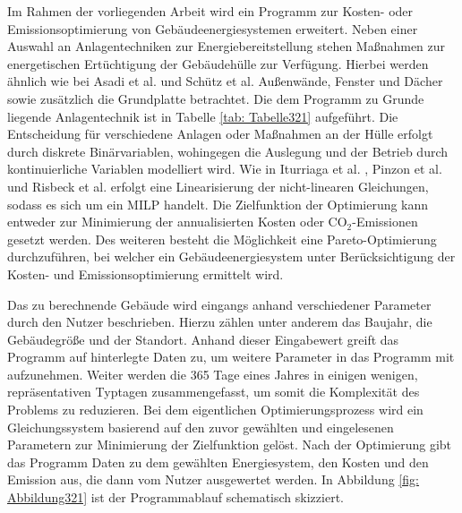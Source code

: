 Im Rahmen der vorliegenden Arbeit wird ein Programm zur Kosten- oder Emissionsoptimierung von Gebäudeenergiesystemen erweitert.
Neben einer Auswahl an Anlagentechniken zur Energiebereitstellung stehen Maßnahmen zur energetischen Ertüchtigung der Gebäudehülle zur Verfügung. 
Hierbei werden ähnlich wie bei Asadi et al. \cite{Asadi.2012} und Schütz et al. \cite{Schutz.2017} Außenwände, Fenster und Dächer sowie zusätzlich die Grundplatte betrachtet.
Die dem Programm zu Grunde liegende Anlagentechnik ist in Tabelle \ref{tab: Tabelle321} aufgeführt.
Die Entscheidung für verschiedene Anlagen oder Maßnahmen an der Hülle erfolgt durch diskrete Binärvariablen, wohingegen die Auslegung und der Betrieb durch kontinuierliche Variablen modelliert wird.
Wie in Iturriaga et al. \cite{Iturriaga.2017}, Pinzon et al. \cite{Pinzon.23.04.201726.04.2017} und Risbeck et al. \cite{Risbeck.2017} erfolgt eine Linearisierung der nicht-linearen Gleichungen, sodass es sich um ein MILP handelt.
Die Zielfunktion der Optimierung kann entweder zur Minimierung der annualisierten Kosten oder CO\(_2\)-Emissionen gesetzt werden.
Des weiteren besteht die Möglichkeit eine Pareto-Optimierung durchzuführen, bei welcher ein Gebäudeenergiesystem unter Berücksichtigung der Kosten- und Emissionsoptimierung ermittelt wird.

Das zu berechnende Gebäude wird eingangs anhand verschiedener Parameter durch den Nutzer beschrieben.
Hierzu zählen unter anderem das Baujahr, die Gebäudegröße und der Standort.
Anhand dieser Eingabewert greift das Programm auf hinterlegte Daten zu, um weitere Parameter in das Programm mit aufzunehmen.
Weiter werden die 365 Tage eines Jahres in einigen wenigen, repräsentativen Typtagen zusammengefasst, um somit die Komplexität des Problems zu reduzieren.
Bei dem eigentlichen Optimierungsprozess wird ein Gleichungssystem basierend auf den zuvor gewählten und eingelesenen Parametern zur Minimierung der Zielfunktion gelöst.
Nach der Optimierung gibt das Programm Daten zu dem gewählten Energiesystem, den Kosten und den Emission aus, die dann vom Nutzer ausgewertet werden.
In Abbildung \ref{fig: Abbildung321} ist der Programmablauf schematisch skizziert.

